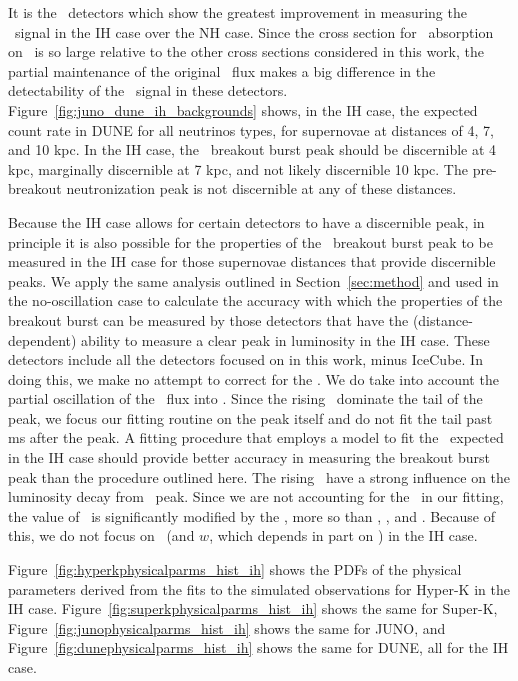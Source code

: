 It is the \ detectors which show the greatest improvement in
measuring the \nue\ signal in the IH case over the NH case.  Since
the cross section for \nue\ absorption on \ is so large relative to
the other cross sections considered in this work, the partial
maintenance of the original \nue\ flux makes a big difference in
the detectability of the \nue\ signal in these detectors.  
Figure~\ref{fig:juno_dune_ih_backgrounds}
shows, in the IH case, the expected count rate in DUNE 
for all neutrinos types, for
supernovae at distances of 4, 7, and 10 kpc.  In the IH case, 
the \nue\ breakout burst
peak should be discernible at 4 kpc, marginally discernible at 7 kpc,
and not likely discernible 10 kpc.  The pre-breakout neutronization
peak is not discernible  at any of these distances.

Because the IH case allows for certain detectors to have a 
discernible peak, in principle it is also possible for the properties
of the \nue\ breakout burst peak to be measured in the IH case for
those 
supernovae
distances that provide discernible peaks.  We apply the same
analysis outlined in Section~\ref{sec:method} and used in the
no-oscillation case to calculate the accuracy with which the
properties of the breakout burst can be measured by those 
detectors that have the (distance-dependent) ability to measure a
clear peak in luminosity in the IH case.  
These detectors include all the detectors
focused on in this work, minus IceCube.  In doing this, we make no
attempt to correct for the \backgrounds.  We do
take into account the partial oscillation of the \nue\ flux into \nuxpart.
Since the rising \background\ dominate the tail of the peak, we focus
our fitting routine on the peak itself and do not fit the tail past 
ms after the peak.  A fitting procedure that employs a model to fit
the \backgrounds\ expected in the IH case should provide better accuracy
in measuring the breakout burst peak than the procedure outlined
here.  The rising \background\ have a strong influence on the
luminosity decay from \nue\ peak.  Since we are not accounting for the
\backgrounds\ in our fitting, the value of \tfall\ is significantly
modified by the \backgrounds, more so than \lmax, \tmax,
and \trise.  Because of this, we do not focus on \tfall\ (and $w$,
which depends in part on \tfall) in the IH case.


Figure~\ref{fig:hyperkphysicalparms_hist_ih} shows the PDFs of the
physical parameters derived from the fits to the simulated
observations for Hyper-K in the IH
case. Figure~\ref{fig:superkphysicalparms_hist_ih} shows the same for
Super-K, Figure~\ref{fig:junophysicalparms_hist_ih} shows the same
for JUNO, and Figure~\ref{fig:dunephysicalparms_hist_ih} shows the
same for DUNE, all for the IH case.

